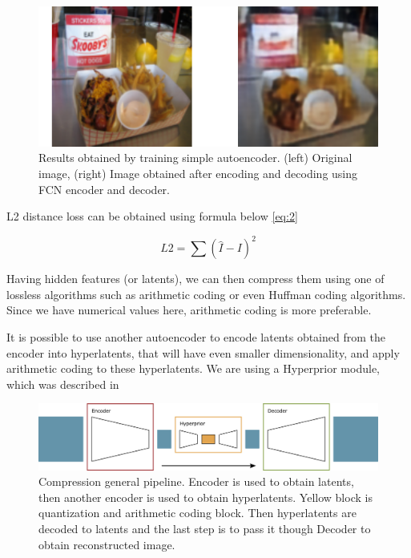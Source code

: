 \begin{figure}[!ht]
    \centering
    \includegraphics[width=\textwidth]{figure/autoencoder-result.png}
    \caption{Results obtained by training simple autoencoder. (left) Original image, (right) Image obtained after encoding and decoding  using FCN encoder and decoder.}
    \label{autoencoder-result}
\end{figure}

L2 distance loss can be obtained using formula below \ref{eq:2}

\begin{equation}
    \label{eq:2}
    L2=\sum (\hat{I}-I)^2
\end{equation}

Having hidden features (or latents), we can then compress them using one of lossless algorithms such as arithmetic coding or even Huffman coding algorithms. Since we have numerical values here, arithmetic coding is more preferable.

It is possible to use another autoencoder to encode latents obtained from the encoder into hyperlatents, that will have even smaller dimensionality, and apply arithmetic coding to these hyperlatents. We are using a Hyperprior module, which was described in \cite{Ballé_Minnen_Singh_Hwang_Johnston_2018}

\begin{figure}[!ht]
    \centering
    \includegraphics[width=\textwidth]{figure/general.png}
    \caption{Compression general pipeline. Encoder is used to obtain latents, then another encoder is used to obtain hyperlatents. Yellow block is quantization and arithmetic coding block. Then hyperlatents are decoded to latents and the last step is to pass it though Decoder to obtain reconstructed image.}
    \label{whole-system-geneal-pipeline}
\end{figure}

